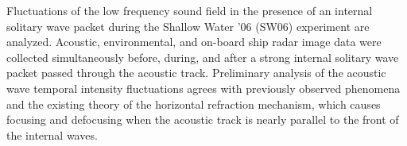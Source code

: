 
Fluctuations of the low frequency sound field in the presence of an
internal solitary wave packet during the Shallow Water '06 (SW06)
experiment are analyzed. Acoustic, environmental, and on-board ship
radar image data were collected simultaneously before, during, and
after a strong internal solitary wave packet passed through the
acoustic track. Preliminary analysis of the acoustic wave temporal
intensity fluctuations agrees with previously observed phenomena and
the existing theory of the horizontal refraction mechanism, which
causes focusing and defocusing when the acoustic track is nearly
parallel to the front of the internal waves.



